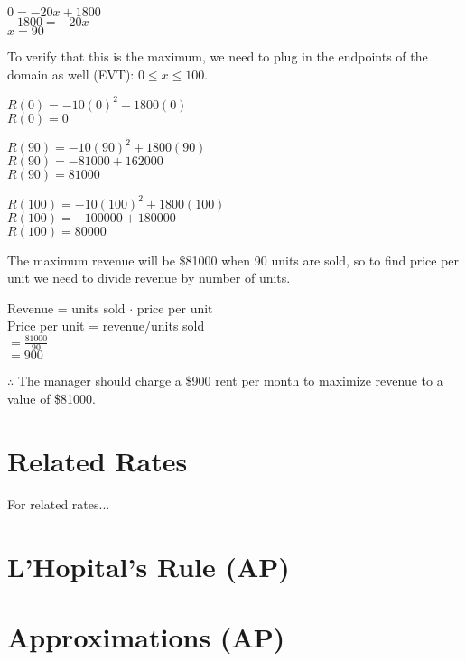 \documentclass[12pt,fleqn]{book} %
\begin{document}
\begin{center}
    $0 =-20x+1800$ \\
    $-1800=-20x$ \\
    $x=90$ \\
\end{center}

\noindent To verify that this is the maximum, we need to plug in the endpoints of the domain as well (EVT): $0\leq x \leq 100$.

\begin{multicols}{3}
    \begin{center}
        $R(0)=-10(0)^2+1800(0)$ \\
        $R(0)=0$
        \columnbreak

        $R(90)=-10(90)^2+1800(90)$ \\
        $R(90)=-81000+162000$ \\
        $R(90)=81000$
        \columnbreak

        $R(100)=-10(100)^2+1800(100)$ \\
        $R(100)=-100000+180000$ \\
        $R(100)=80000$
    \end{center}
\end{multicols}

\noindent The maximum revenue will be \$81000 when 90 units are sold, so to find price per unit we need to divide revenue by number of units.

\begin{center}
    Revenue = units sold $\cdot$ price per unit \\
    Price per unit = revenue/units sold \\
    $= \frac{81000}{90}$ \\
    $=900$
\end{center}

\noindent $\therefore$ The manager should charge a \$900 rent per month to maximize revenue to a value of \$81000.

\pagebreak

\section{Related Rates}

For related rates...

\vspace*{5mm}


\section{L'Hopital's Rule (AP)}

\section{Approximations (AP)}
\end{document}
